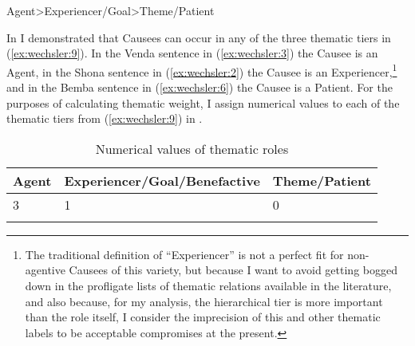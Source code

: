 \documentclass[output=paper,modfonts,nonflat,colorlinks,citecolor=brown]{langsci/langscibook}
\begin{document}
\ea\label{ex:wechsler:9}
 {Agent>Experiencer/Goal>Theme/Patient}\\
\z

In  I demonstrated that Causees can occur in any of the three thematic tiers in (\ref{ex:wechsler:9}). In the Venda sentence in (\ref{ex:wechsler:3}) the Causee is an Agent, in the Shona sentence in (\ref{ex:wechsler:2}) the Causee is an Experiencer,\footnote{The traditional definition of “Experiencer” is not a perfect fit for non-agentive Causees of this variety, but because I want to avoid getting bogged down in the profligate lists of thematic relations available in the literature, and also because, for my analysis, the hierarchical tier is more important than the role itself, I consider the imprecision of this and other thematic labels to be acceptable compromises at the present.}  and in the Bemba sentence in (\ref{ex:wechsler:6}) the Causee is a Patient. For the purposes of calculating thematic weight, I assign numerical values to each of the thematic tiers from (\ref{ex:wechsler:9}) in . 

\begin{table}
\begin{tabularx}{\textwidth}{Xll}
\lsptoprule
 Agent & Experiencer/Goal/Benefactive & Theme/Patient\\
 \midrule
 3 & 1 & 0\\
\lspbottomrule
\end{tabularx}
\caption{Numerical values of thematic roles}
\label{tab:wechsler:1}
\end{table}
\end{document}
